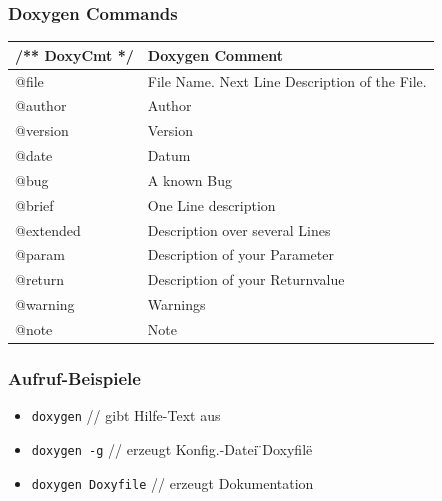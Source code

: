 \begin{multicols}{2}
\subsubsection{Doxygen Commands}
\renewcommand{\arraystretch}{1.3}
\begin{minipage}{\linewidth}
\begin{tabular}{|l|l|}
	\hline	/** DoxyCmt */  &  Doxygen Comment\\ 
	\hline	@file	      	& File Name. Next Line Description of the File.\\
	\hline	@author 	    & Author\\
	\hline	@version	    & Version \\
	\hline   @date		    & Datum   \\ 
	\hline   @bug    		& A known Bug \\
	\hline   @brief	    	& One Line description  \\
	\hline   @extended	    & Description over several Lines  \\
	\hline   @param	       	& Description of your Parameter  \\
	\hline   @return	    & Description of your Returnvalue     \\ 
	\hline   @warning	    & Warnings \\ 
	\hline   @note		    & Note\\ 
	\hline        
\end{tabular}
\end{minipage}
\subsubsection{Aufruf-Beispiele}
\begin{minipage}{\linewidth}
\begin{itemize}
\item \texttt{doxygen} // gibt Hilfe-Text aus
\item \texttt{doxygen -g}           // erzeugt Konfig.-Datei \"{}Doxyfile\"{}
\item \texttt{doxygen Doxyfile}     // erzeugt Dokumentation
\end{itemize}
\end{minipage}
\end{multicols}
\clearpage
